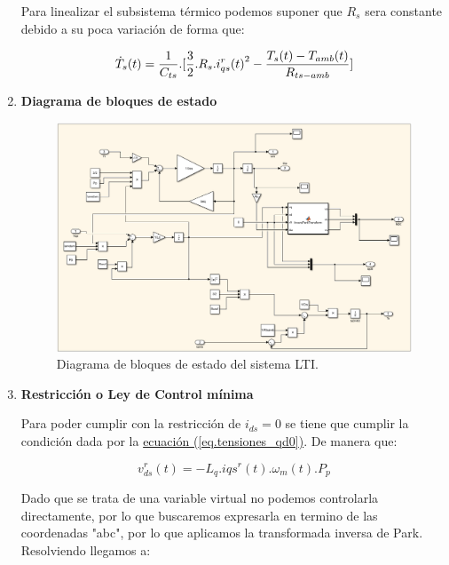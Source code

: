 \documentclass{article}
\begin{document}
\begin{enumerate}[label=\roman*.]
    Para linealizar el subsistema térmico podemos suponer que $R_s$ sera constante debido a su poca variación
    de forma que:

    \begin{equation}
        \dot{T}_{s}(t) = \frac{1}{C_{ts}}.[\frac{3}{2}.R_{s}.{i_{qs}^r(t)}^2 - \frac{T_{s}(t)-T_{amb}(t)}{R_{ts-amb}}]\\
    \end{equation}
        
    \item \textbf{Diagrama de bloques de estado}
    
    \begin{figure}[H]
        \centering
        \includegraphics[width=1\textwidth]{LTI.png}
        \caption{Diagrama de bloques de estado del sistema LTI.}
    \end{figure}
    
    \item \textbf{Restricción o Ley de Control mínima}

    Para poder cumplir con la restricción de $i_{ds} = 0$ se tiene que cumplir la condición dada por la
    \hyperref[eq.tensiones_qd0]{ecuación (\ref*{eq.tensiones_qd0})}. De manera que:

    \begin{equation}
        v_{ds}^r(t) = -L_{q}.i{qs}^r(t).\omega_{m}(t).P_{p}
    \end{equation}

    Dado que se trata de una variable virtual no podemos controlarla directamente, por lo que buscaremos
    expresarla en termino de las coordenadas "abc", por lo que aplicamos la transformada inversa de Park.
    Resolviendo llegamos a:


\end{enumerate}
\end{document}
